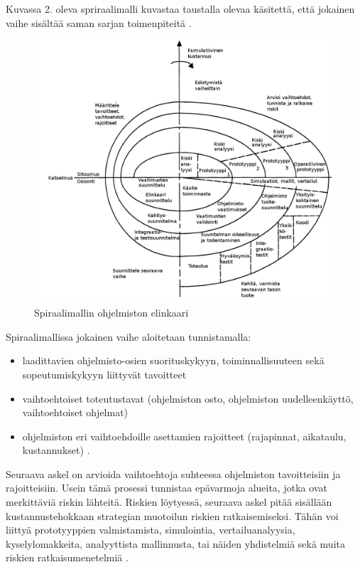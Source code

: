 \documentclass[finnish]{tktltiki2}
\theoremstyle{definition}
\theoremstyle{remark}
\begin{document}
Kuvassa 2. oleva spriraalimalli kuvastaa taustalla olevaa käsitettä, että jokainen vaihe sisältää saman sarjan toimenpiteitä \cite{BOE88}.

\begin{figure}[h!]
  \caption{Spiraalimallin ohjelmiston elinkaari}
  \centering
    \includegraphics[width=\textwidth]{spiral}
\end{figure}

Spiraalimallissa jokainen vaihe aloitetaan tunnistamalla:
\begin{itemize}
  \item laadittavien ohjelmisto-osien suorituskykyyn, toiminnallisuuteen sekä sopeutumiskykyyn liittyvät tavoitteet
  \item vaihtoehtoiset toteutustavat (ohjelmiston osto, ohjelmiston uudelleenkäyttö, vaihtoehtoiset ohjelmat)
  \item ohjelmiston eri vaihtoehdoille asettamien rajoitteet (rajapinnat, aikataulu, kustannukset) \cite{BOE88}.
\end{itemize}

Seuraava askel on arvioida vaihtoehtoja suhteessa ohjelmiston tavoitteisiin ja rajoitteisiin. Usein tämä prosessi tunnistaa epävarmoja alueita, jotka ovat merkittäviä riskin lähteitä. Riskien löytyessä, seuraava askel pitää sisällään kustannustehokkaan strategian muotoilun riskien ratkaisemiseksi. Tähän voi liittyä prototyyppien valmistamista, simulointia, vertailuanalyysia, kyselylomakkeita, analyyttista mallinnusta, tai näiden yhdistelmiä sekä muita riskien ratkaisumenetelmiä \cite{BOE88}.
\end{document}
